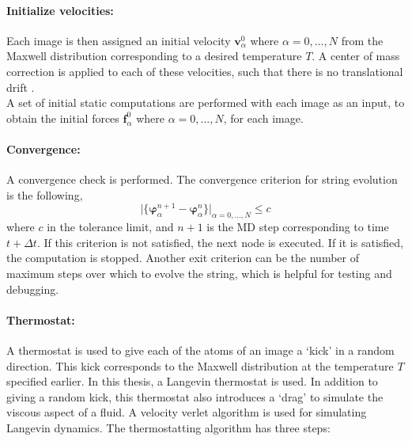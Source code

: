 \documentclass{article}
\begin{document}
\paragraph*{Initialize velocities:}

Each image is then assigned an initial velocity $\bm{v}_{\alpha}^0$ where $\alpha=0,...,N$ from the Maxwell distribution corresponding to a desired temperature $T$. A center of mass correction is applied to each of these velocities, such that there is no translational drift \cite{Bender2000}. \\

\noindent A set of initial static computations are performed with each image as an input, to obtain the initial forces $\bm{f}_{\alpha}^0$ where $\alpha=0,...,N$, for each image. 

\paragraph*{Convergence:}

A convergence check is performed. The convergence criterion for string evolution is the following,
%
\begin{equation} \label{eq:13}
\mathopen|\{\bm{\varphi}_{\alpha}^{n+1} - \bm{\varphi}_{\alpha}^{n}\}\mathclose|_{\alpha=0,...,N} \leq c
\end{equation}
%
where $c$ in the tolerance limit, and $n+1$ is the MD step corresponding to time $t+\Delta t$. If this criterion is not satisfied, the next node is executed. If it is satisfied, the computation is stopped. Another exit criterion can be the number of maximum steps over which to evolve the string, which is helpful for testing and debugging.

\paragraph*{Thermostat:}

A thermostat is used to give each of the atoms of an image a \enquote*{kick} in a random direction. This kick corresponds to the Maxwell distribution at the temperature $T$ specified earlier. In this thesis, a Langevin thermostat \cite{Davidchack2009} is used. In addition to giving a random kick, this thermostat also introduces a \enquote*{drag} to simulate the viscous aspect of a fluid. A velocity verlet algorithm \cite{Swope1982} is used for simulating Langevin dynamics. The thermostatting algorithm has three steps:
\end{document}
